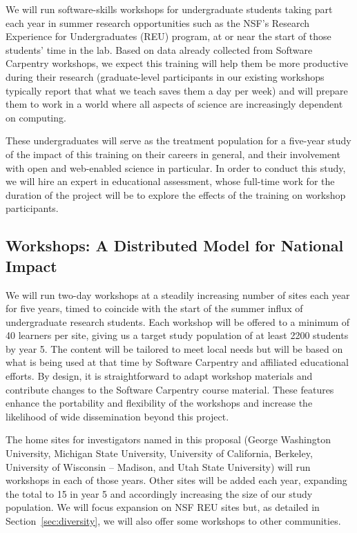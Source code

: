 \documentclass{proposalnsf}
\begin{document}
We will run software-skills workshops for undergraduate students
taking part each year in summer research opportunities such as the
NSF's Research Experience for Undergraduates (REU) program, at or near
the start of those students' time in the lab.  Based on data already
collected from Software Carpentry workshops, we expect this training
will help them be more productive during their research (graduate-level
participants in our existing workshops typically report that what we
teach saves them a day per week) and will prepare them to work in a
world where all aspects of science are increasingly dependent on
computing.

These undergraduates will serve as the treatment population for a
five-year study of the impact of this training on their careers in
general, and their involvement with open and web-enabled science in
particular.  In order to conduct this study, we will hire an expert in
educational assessment, whose full-time work for the duration of the
project will be to explore the effects of the training on workshop
participants.

\subsection{Workshops: A Distributed Model for National Impact}

We will run two-day workshops at a steadily increasing number of sites
each year for five years, timed to coincide with the start of the
summer influx of undergraduate research students.  Each workshop will
be offered to a minimum of 40 learners per site, giving us a target
study population of at least 2200 students by year 5.  The content will be
tailored to meet local needs but will be based on what is being used
at that time by Software Carpentry and affiliated educational efforts.
By design, it is straightforward to adapt workshop materials and
contribute changes to the Software Carpentry course material.  These
features enhance the portability and flexibility of the workshops and
increase the likelihood of wide dissemination beyond this project.

The home sites for investigators named in this proposal (George
Washington University, Michigan State University, University of
California, Berkeley, University of Wisconsin -- Madison, and
Utah State University) will run workshops in each of those years.
Other sites will be added each year, expanding the total to 15 in
year 5 and accordingly increasing the size of our study population.  We will
focus expansion on NSF REU sites \cite{nsfreu} but, as detailed in
Section~\ref{sec:diversity}, we will also offer some workshops to
other communities.
\end{document}
